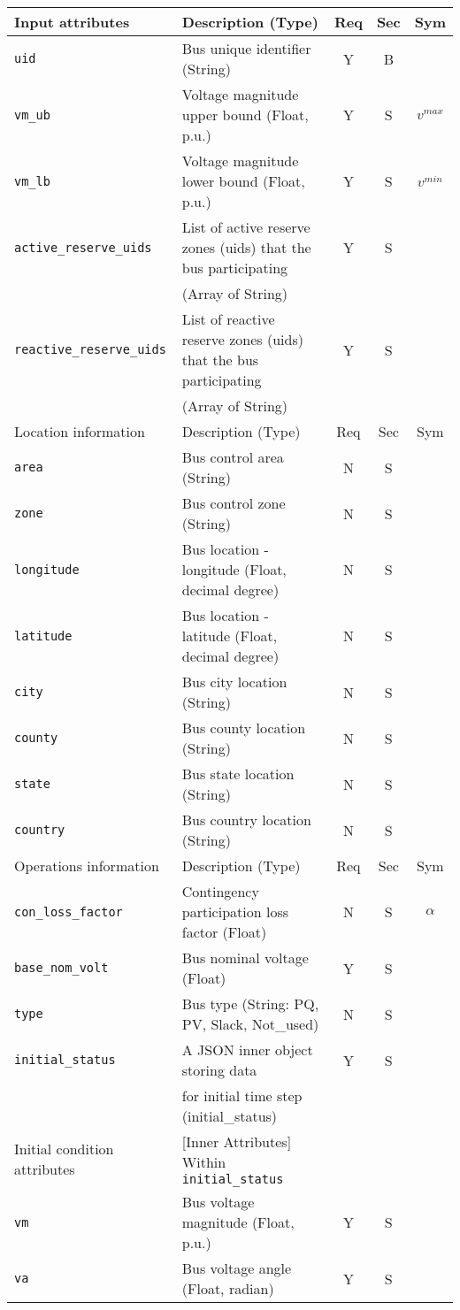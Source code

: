 \documentclass{article}
\begin{document}
\begin{center}
\small
\begin{tabular}{ l | l | c | c | c |}
Input attributes & Description (Type) & Req & Sec & Sym\\
\hline
  {\tt uid} & Bus unique identifier (String)& Y & B &  \\
  {\tt vm\_ub} & Voltage magnitude upper bound (Float, p.u.)& Y & S & $v^{max}$\\
  {\tt vm\_lb} & Voltage magnitude lower bound (Float, p.u.)& Y & S & $v^{min}$\\
  {\tt active\_reserve\_uids} & List of active reserve zones (uids) that the bus participating & Y & S & \\
                     &  (Array of String) &  & & \\
  {\tt reactive\_reserve\_uids} & List of reactive reserve zones (uids) that the bus participating & Y & S & \\
                     &  (Array of String) &  & & \\
  \hline
  Location information & Description (Type) & Req & Sec & Sym\\
  \hline
  {\tt area} &  Bus control area (String)& N & S & \\
  {\tt zone} &  Bus control zone (String)& N & S & \\
  {\tt longitude} & Bus location - longitude (Float, decimal degree) & N & S & \\
  {\tt latitude} & Bus location - latitude   (Float, decimal degree) & N & S & \\
  {\tt city}     & Bus city location (String) & N & S & \\
  {\tt county}     & Bus county location (String) & N & S & \\
  {\tt state}    & Bus state location (String) & N & S & \\
  {\tt country}  & Bus country location (String) & N & S & \\
  \hline
    Operations information & Description (Type) & Req & Sec & Sym\\
  \hline
  {\tt con\_loss\_factor} & Contingency participation loss factor (Float) & N & S & $\alpha$\\
  {\tt base\_nom\_volt} & Bus nominal voltage (Float) & Y & S & \\
  {\tt type} & Bus type (String: PQ, PV, Slack, Not\_used) & N & S &\\
  {\tt initial\_status} & A JSON inner object storing data  & Y & S &  \\
       & for initial time step (initial\_status) &  &  &  \\
  \hline
  Initial condition attributes & [Inner Attributes] Within {\tt initial\_status} & & & \\
  \hline
  {\tt vm}   & Bus voltage magnitude (Float, p.u.) & Y & S & \\
  {\tt va}   & Bus voltage angle     (Float, radian) & Y & S & \\
  \hline
\end{tabular}
\end{center}\textbf{}
\end{document}
